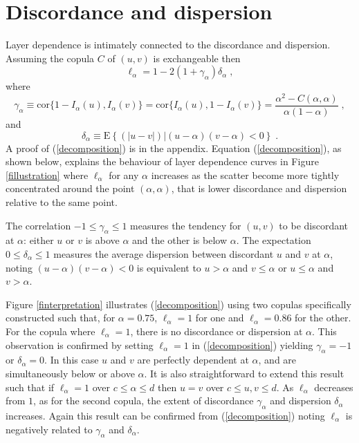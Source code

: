 \documentclass[authoryear]{elsarticle}
\newcommand{\E}{{\mathrm E}}
\newcommand{\cor}{\mathrm{cor}}
\newcommand{\eref}[1]{(\ref{#1})}
\newcommand{\fref}[1]{Figure \ref{#1}}
\begin{document}
\section{Discordance and dispersion}\label{sdecompose}

Layer dependence is intimately connected to the discordance and dispersion.
Assuming the copula $C$ of $(u,v)$ is exchangeable then
\begin{equation}\label{decomposition}
\ell_\alpha = 1-2(1+\gamma_\alpha) \delta_\alpha \;,
\end{equation}
where
$$
\gamma_\alpha \equiv \cor\{1-I_\alpha(u),I_\alpha(v)\} =\cor\{I_\alpha(u),1-I_\alpha(v)\}=\frac{\alpha^2-C(\alpha,\alpha)}{\alpha(1-\alpha)}\;,
$$
and
$$
\delta_\alpha \equiv\E\left\{(|u-v|)|(u-\alpha)(v-\alpha)<0\right\}  \; .
$$
A proof of \eref{decomposition} is  in the appendix. Equation \eref{decomposition}, as shown below, explains the behaviour of layer dependence curves in \fref{fillustration} where $\ell_\alpha$ for any $\alpha$ increases as the scatter become more tightly concentrated  around the point $(\alpha,\alpha)$, that is lower discordance and dispersion relative to the same point.

The correlation $-1\leq\gamma_\alpha\leq 1$ measures the tendency for $(u,v)$ to be discordant at $\alpha$: either $u$ or $v$ is above $\alpha$ and the other is below $\alpha$. The expectation $0\leq \delta_\alpha\leq 1$ measures the average dispersion between discordant $u$ and $v$ at $\alpha$, noting $(u-\alpha)(v-\alpha)<0$ is equivalent to $u>\alpha$ and $v\le\alpha$ or $u\le\alpha$ and $v>\alpha$.


\fref{finterpretation} illustrates \eref{decomposition} using two copulas specifically constructed such that, for $\alpha=0.75$, $\ell_\alpha=1$ for one and $\ell_\alpha=0.86$ for the other. For the copula where $\ell_\alpha=1$, there is no discordance or dispersion at $\alpha$. This observation is confirmed by setting $\ell_\alpha=1$ in \eref{decomposition} yielding $\gamma_\alpha=-1$ or $\delta_\alpha=0$. In this case $u$ and $v$ are perfectly dependent at $\alpha$, and are simultaneously below or above $\alpha$. It is also straightforward to extend this result such that if $\ell_\alpha=1$ over $c\le\alpha\le d$ then $u=v$ over $c\le u,v\le d$. As $\ell_\alpha$ decreases from $1$, as for the second copula, the extent of discordance $\gamma_\alpha$ and dispersion $\delta_\alpha$ increases. Again this result can be confirmed from \eref{decomposition} noting $\ell_\alpha$ is negatively related to $\gamma_\alpha$ and $\delta_\alpha$.
\end{document}

